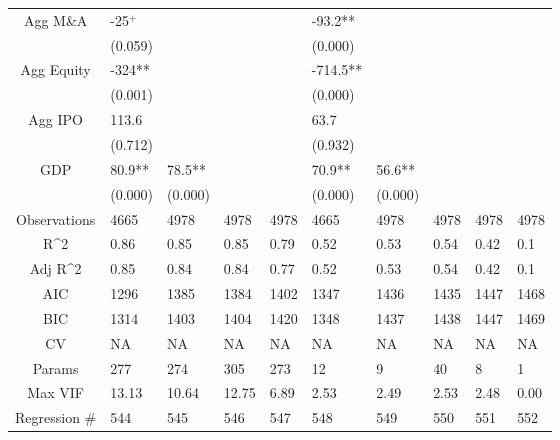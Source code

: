 \documentclass{article}
\begin{document}
\begin{table}[H]
\begin{tabular}{|clllllllll|}
  Agg M\&A & -25$^{+}$ &  &  &  & -93.2** &  &  &  &  \\
   & (0.059) &  &  &  & (0.000) &  &  &  &  \\
  Agg Equity & -324** &  &  &  & -714.5** &  &  &  &  \\
   & (0.001) &  &  &  & (0.000) &  &  &  &  \\
  Agg IPO & 113.6 &  &  &  & 63.7 &  &  &  &  \\
   & (0.712) &  &  &  & (0.932) &  &  &  &  \\
  GDP & 80.9** & 78.5** &  &  & 70.9** & 56.6** &  &  &  \\
   & (0.000) & (0.000) &  &  & (0.000) & (0.000) &  &  &  \\
  \hline
 Observations & 4665 & 4978 & 4978 & 4978 & 4665 & 4978 & 4978 & 4978 & 4978 \\
  R^2 & 0.86 & 0.85 & 0.85 & 0.79 & 0.52 & 0.53 & 0.54 & 0.42 & 0.1 \\
  Adj R^2 & 0.85 & 0.84 & 0.84 & 0.77 & 0.52 & 0.53 & 0.54 & 0.42 & 0.1 \\
  AIC & 1296 & 1385 & 1384 & 1402 & 1347 & 1436 & 1435 & 1447 & 1468 \\
  BIC & 1314 & 1403 & 1404 & 1420 & 1348 & 1437 & 1438 & 1447 & 1469 \\
  CV & NA & NA & NA & NA & NA & NA & NA & NA & NA \\
  Params & 277 & 274 & 305 & 273 & 12 & 9 & 40 & 8 & 1 \\
  Max VIF & 13.13 & 10.64 & 12.75 & 6.89 & 2.53 & 2.49 & 2.53 & 2.48 & 0.00 \\
  Regression \# & 544 & 545 & 546 & 547 & 548 & 549 & 550 & 551 & 552 \\
   \hline
\end{tabular}

\end{table}
\end{document}

